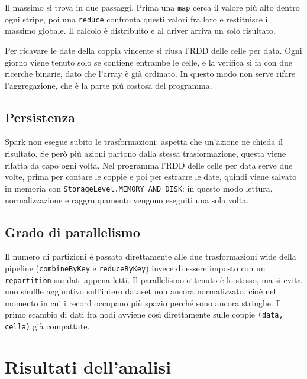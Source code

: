 \documentclass[11pt,a4paper]{article}
\begin{document}
Il massimo si trova in due passaggi. Prima una \texttt{map} cerca il valore più alto dentro ogni
stripe, poi una \texttt{reduce} confronta questi valori fra loro e restituisce il massimo globale.
Il calcolo è distribuito e al driver arriva un solo risultato.

Per ricavare le date della coppia vincente si riusa l'RDD delle celle per data. Ogni giorno viene
tenuto solo se contiene entrambe le celle, e la verifica si fa con due ricerche binarie, dato che
l'array è già ordinato. In questo modo non serve rifare l'aggregazione, che è la parte più costosa
del programma.

\subsection{Persistenza}

Spark non esegue subito le trasformazioni: aspetta che un'azione ne chieda il risultato. Se però
più azioni partono dalla stessa trasformazione, questa viene rifatta da capo ogni volta. Nel
programma l'RDD delle celle per data serve due volte, prima per contare le coppie e poi per
estrarre le date, quindi viene salvato in memoria con \texttt{StorageLevel.MEMORY\_AND\_DISK}:
in questo modo lettura, normalizzazione e raggruppamento vengono eseguiti una sola volta.

\subsection{Grado di parallelismo}

Il numero di partizioni è passato direttamente alle due trasformazioni wide della pipeline
(\texttt{combineByKey} e \texttt{reduceByKey}) invece di essere imposto con un
\texttt{repartition} sui dati appena letti. Il parallelismo ottenuto è lo stesso, ma si evita uno
shuffle aggiuntivo sull'intero dataset non ancora normalizzato, cioè nel momento in cui i record
occupano più spazio perché sono ancora stringhe. Il primo scambio di dati fra nodi avviene così
direttamente sulle coppie \texttt{(data, cella)} già compattate.



















\section{Risultati dell'analisi}
\end{document}
